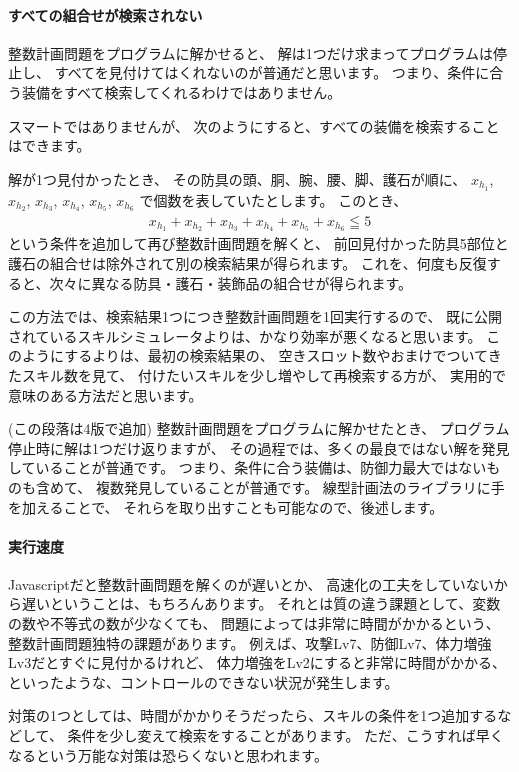 \documentclass{jsarticle}
\begin{document}
\paragraph{すべての組合せが検索されない}
整数計画問題をプログラムに解かせると、
解は1つだけ求まってプログラムは停止し、
すべてを見付けてはくれないのが普通だと思います。
つまり、条件に合う装備をすべて検索してくれるわけではありません。

スマートではありませんが、
次のようにすると、すべての装備を検索することはできます。

解が1つ見付かったとき、
その防具の頭、胴、腕、腰、脚、護石が順に、
$x_{h_1}$, $x_{h_2}$, $x_{h_3}$, $x_{h_4}$, $x_{h_5}$, $x_{h_6}$
で個数を表していたとします。
このとき、
\begin{align*}
x_{h_1} + x_{h_2} + x_{h_3} + x_{h_4} + x_{h_5} + x_{h_6}\leqq 5
\tag{検索済みの防具・護石の組合せを除外}
\end{align*}
という条件を追加して再び整数計画問題を解くと、
前回見付かった防具5部位と護石の組合せは除外されて別の検索結果が得られます。
%
これを、何度も反復すると、次々に異なる防具・護石・装飾品の組合せが得られます。

この方法では、検索結果1つにつき整数計画問題を1回実行するので、
既に公開されているスキルシミュレータよりは、かなり効率が悪くなると思います。
%
このようにするよりは、最初の検索結果の、
空きスロット数やおまけでついてきたスキル数を見て、
付けたいスキルを少し増やして再検索する方が、
実用的で意味のある方法だと思います。

(この段落は4版で追加)
整数計画問題をプログラムに解かせたとき、
プログラム停止時に解は1つだけ返りますが、
その過程では、多くの最良ではない解を発見していることが普通です。
つまり、条件に合う装備は、防御力最大ではないものも含めて、
複数発見していることが普通です。
%
線型計画法のライブラリに手を加えることで、
それらを取り出すことも可能なので、後述します。

\paragraph{実行速度}
Javascriptだと整数計画問題を解くのが遅いとか、
高速化の工夫をしていないから遅いということは、もちろんあります。
それとは質の違う課題として、変数の数や不等式の数が少なくても、
問題によっては非常に時間がかかるという、
整数計画問題独特の課題があります。
例えば、攻撃Lv7、防御Lv7、体力増強Lv3だとすぐに見付かるけれど、
体力増強をLv2にすると非常に時間がかかる、
といったような、コントロールのできない状況が発生します。

対策の1つとしては、時間がかかりそうだったら、スキルの条件を1つ追加するなどして、
条件を少し変えて検索をすることがあります。
ただ、こうすれば早くなるという万能な対策は恐らくないと思われます。
\end{document}

